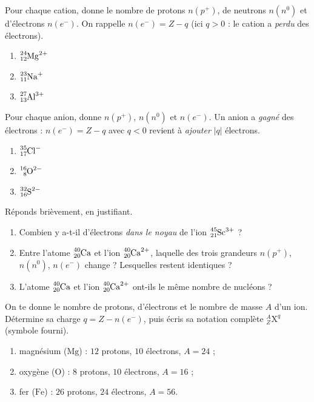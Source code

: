 \documentclass[11pt,a4paper]{article}
\begin{document}
\begin{exo}
Pour chaque cation, donne le nombre de protons $n(p^+)$, de neutrons $n(n^0)$ et d'électrons $n(e^-)$.
On rappelle $n(e^-) = Z - q$ (ici $q>0$ : le cation a \emph{perdu} des électrons).
\begin{enumerate}[label=\alph*)]
  \item $\ce{^{24}_{12}Mg^{2+}}$
  \item $\ce{^{23}_{11}Na^{+}}$
  \item $\ce{^{27}_{13}Al^{3+}}$
\end{enumerate}
\end{exo}

\begin{exo}
Pour chaque anion, donne $n(p^+)$, $n(n^0)$ et $n(e^-)$. Un anion a \emph{gagné} des électrons :
$n(e^-) = Z - q$ avec $q<0$ revient à \emph{ajouter} $|q|$ électrons.
\begin{enumerate}[label=\alph*)]
  \item $\ce{^{35}_{17}Cl^{-}}$
  \item $\ce{^{16}_{8}O^{2-}}$
  \item $\ce{^{32}_{16}S^{2-}}$
\end{enumerate}
\end{exo}

\begin{exo}
Réponds brièvement, en justifiant.
\begin{enumerate}[label=\alph*)]
  \item Combien y a-t-il d'électrons \emph{dans le noyau} de l'ion $\ce{^{45}_{21}Sc^{3+}}$ ?
  \item Entre l'atome $\ce{^{40}_{20}Ca}$ et l'ion $\ce{^{40}_{20}Ca^{2+}}$, laquelle des trois grandeurs
        $n(p^+)$, $n(n^0)$, $n(e^-)$ change ? Lesquelles restent identiques ?
  \item L'atome $\ce{^{40}_{20}Ca}$ et l'ion $\ce{^{40}_{20}Ca^{2+}}$ ont-ils le même nombre de nucléons ?
\end{enumerate}
\end{exo}

\begin{exo}
On te donne le nombre de protons, d'électrons et le nombre de masse $A$ d'un ion. Détermine sa charge
$q = Z - n(e^-)$, puis écris sa notation complète $^{A}_{Z}\mathrm{X}^{q}$ (symbole fourni).
\begin{enumerate}[label=\alph*)]
  \item magnésium ($\mathrm{Mg}$) : $12$ protons, $10$ électrons, $A = 24$ ;
  \item oxygène ($\mathrm{O}$) : $8$ protons, $10$ électrons, $A = 16$ ;
  \item fer ($\mathrm{Fe}$) : $26$ protons, $24$ électrons, $A = 56$.
\end{enumerate}
\end{exo}
\end{document}
